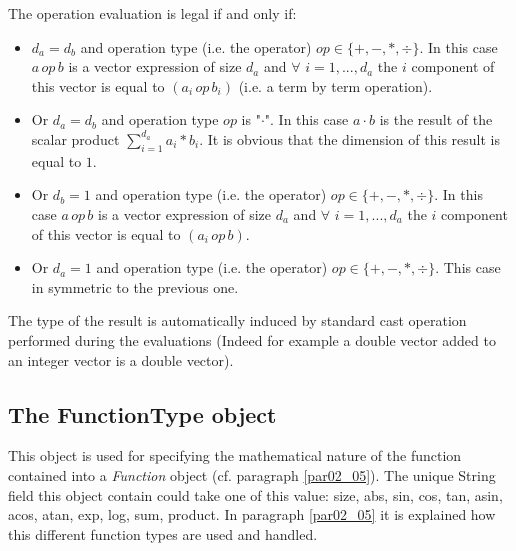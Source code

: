 \documentclass[a4paper,11pt] {article}
\begin{document}
The operation evaluation is legal if and only if:
\begin{itemize}
\item $d_a=d_b$ and operation type (i.e. the operator) $op \in \{ + , - , \ast , \div \}$. In this
case $a \, op \, b$ is a vector expression of size $d_a$ and $\forall$ $i=1,...,d_a$ the $i$
component of this vector is equal to $(a_i \, op \,b_i)$ (i.e. a term by term operation).
\item Or $d_a = d_b$ and operation type $op$ is "$\cdot$". In this case $a \cdot b$ is the result of
the scalar product $\sum_{i =1}^{d_a} a_i \ast b_i$. It is obvious that the dimension of this result
is equal to $1$.
\item Or $d_b=1$ and operation type (i.e. the operator) $op \in \{ + , - , \ast , \div \}$. In this
case $a \, op \, b$ is a vector expression of size $d_a$ and $\forall$ $i=1,...,d_a$ the $i$
component of this vector is equal to $(a_i \, op \,b)$.
\item Or $d_a=1$ and operation type (i.e. the operator) $op \in \{ + , - , \ast , \div \}$. This
case in symmetric to the previous one.
\end{itemize}

The type of the result is automatically induced by standard cast operation performed during the
evaluations (Indeed for example a double vector added to an integer vector is a double vector).

\subsection{The FunctionType object}\label{par-FunctionType}
This object is used for specifying the mathematical nature of the function contained into a {\it
Function} object (cf. paragraph \ref{par02_05}). The unique String field this object contain could
take one of this value:
size, abs, sin, cos, tan, asin, acos, atan, exp, log, sum, product. In paragraph \ref{par02_05} it
is explained how this different function types are used and handled.
\end{document}
